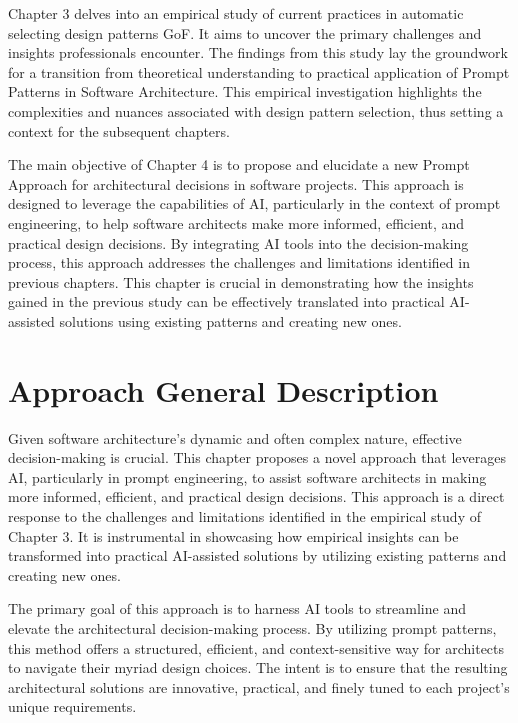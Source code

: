 Chapter 3 delves into an empirical study of current practices in automatic selecting design patterns GoF. It aims to uncover the primary challenges and insights professionals encounter. The findings from this study lay the groundwork for a transition from theoretical understanding to practical application of Prompt Patterns in Software Architecture. This empirical investigation highlights the complexities and nuances associated with design pattern selection, thus setting a context for the subsequent chapters.

The main objective of Chapter 4 is to propose and elucidate a new Prompt Approach for architectural decisions in software projects. This approach is designed to leverage the capabilities of AI, particularly in the context of prompt engineering, to help software architects make more informed, efficient, and practical design decisions. By integrating AI tools into the decision-making process, this approach addresses the challenges and limitations identified in previous chapters. This chapter is crucial in demonstrating how the insights gained in the previous study can be effectively translated into practical AI-assisted solutions using existing patterns and creating new ones.

\section{Approach General Description}

Given software architecture's dynamic and often complex nature, effective decision-making is crucial. This chapter proposes a novel approach that leverages AI, particularly in prompt engineering, to assist software architects in making more informed, efficient, and practical design decisions. This approach is a direct response to the challenges and limitations identified in the empirical study of Chapter 3. It is instrumental in showcasing how empirical insights can be transformed into practical AI-assisted solutions by utilizing existing patterns and creating new ones.



The primary goal of this approach is to harness AI tools to streamline and elevate the architectural decision-making process. By utilizing prompt patterns, this method offers a structured, efficient, and context-sensitive way for architects to navigate their myriad design choices. The intent is to ensure that the resulting architectural solutions are innovative, practical, and finely tuned to each project's unique requirements.

